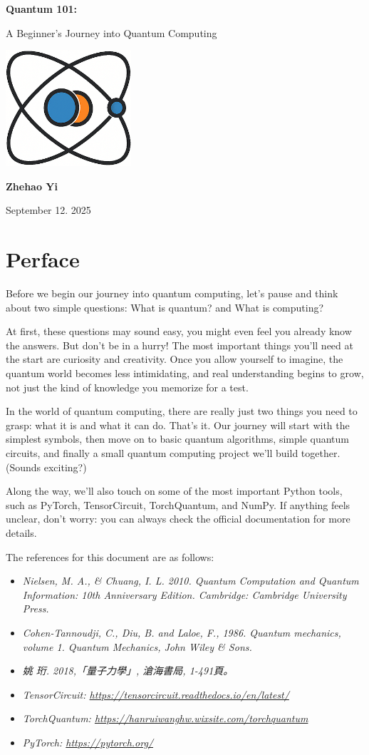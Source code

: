 \documentclass[12pt,oneside]{book}
\newcommand{\makeModernCover}{
\begin{titlepage}

  \vspace*{3cm}
  \begin{center}
    {\Huge\bfseries Quantum 101:\par}
    \vspace{0.8cm}
    {\large A Beginner's Journey into Quantum Computing\par} %

    \vspace{2.5cm}
    \includegraphics[width=0.35\textwidth]{quantumstate.png} %

    \vspace{2.5cm}
    {\Large \textbf{Zhehao Yi}\par}
    \vspace{0.2cm}
    {\large September 12. 2025\par}
  \end{center}
  \vfill
\end{titlepage}
}
\begin{document}
\makeModernCover
\frontmatter
\tableofcontents
\mainmatter

\chapter*{Perface}
Before we begin our journey into quantum computing, let's pause and think about two simple questions: What is quantum? and What is computing?

At first, these questions may sound easy, you might even feel you already know the answers. But don't be in a hurry! The most important things you'll need at the start are curiosity and creativity. Once you allow yourself to imagine, the quantum world becomes less intimidating, and real understanding begins to grow, not just the kind of knowledge you memorize for a test.

In the world of quantum computing, there are really just two things you need to grasp: what it is and what it can do. That's it. Our journey will start with the simplest symbols, then move on to basic quantum algorithms, simple quantum circuits, and finally a small quantum computing project we'll build together. (Sounds exciting?)

Along the way, we'll also touch on some of the most important Python tools, such as PyTorch, TensorCircuit, TorchQuantum, and NumPy. If anything feels unclear, don't worry: you can always check the official documentation for more details.

The references for this document are as follows:
\begin{referencebox}[Reference]
  \begin{itemize}
    \item \textit{Nielsen, M. A., \& Chuang, I. L. 2010. Quantum Computation and Quantum Information: 10th Anniversary Edition. Cambridge: Cambridge University Press.}
    \item \textit{Cohen-Tannoudji, C., Diu, B. and Laloe, F., 1986. Quantum mechanics, volume 1. Quantum Mechanics, John Wiley \& Sons.}
    \item \textit{姚 珩. 2018,「量子力學」, 滄海書局, 1-491頁。}
    \item \textit{TensorCircuit: \href{https://tensorcircuit.readthedocs.io/en/latest/}{https://tensorcircuit.readthedocs.io/en/latest/}}
    \item \textit{TorchQuantum: \href{https://hanruiwanghw.wixsite.com/torchquantum}{https://hanruiwanghw.wixsite.com/torchquantum}}
    \item \textit{PyTorch: \href{https://pytorch.org/}{https://pytorch.org/}}
  \end{itemize}
\end{referencebox}
\end{document}
